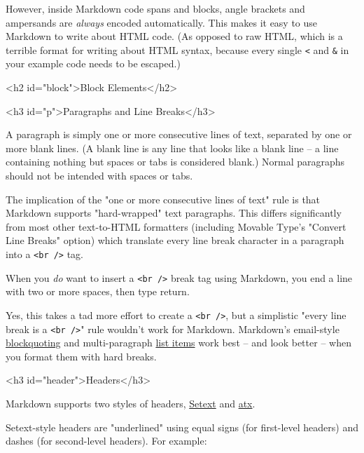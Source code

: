 However, inside Markdown code spans and blocks, angle brackets and
ampersands are \emph{always} encoded automatically. This makes it easy to use
Markdown to write about HTML code. (As opposed to raw HTML, which is a
terrible format for writing about HTML syntax, because every single \texttt{<}
and \texttt{\&} in your example code needs to be escaped.)

\noindent\makebox[\linewidth]{\rule{\linewidth}{0.4pt}}\medskip


<h2 id="block">Block Elements</h2>

<h3 id="p">Paragraphs and Line Breaks</h3>



A paragraph is simply one or more consecutive lines of text, separated
by one or more blank lines. (A blank line is any line that looks like a
blank line -- a line containing nothing but spaces or tabs is considered
blank.) Normal paragraphs should not be intended with spaces or tabs.



The implication of the "one or more consecutive lines of text" rule is
that Markdown supports "hard-wrapped" text paragraphs. This differs
significantly from most other text-to-HTML formatters (including Movable
Type's "Convert Line Breaks" option) which translate every line break
character in a paragraph into a \texttt{<br />} tag.



When you \emph{do} want to insert a \texttt{<br />} break tag using Markdown, you
end a line with two or more spaces, then type return.



Yes, this takes a tad more effort to create a \texttt{<br />}, but a simplistic
"every line break is a \texttt{<br />}" rule wouldn't work for Markdown.
Markdown's email-style \href{\#blockquote}{blockquoting} and multi-paragraph \href{\#list}{list items}
work best -- and look better -- when you format them with hard breaks.

<h3 id="header">Headers</h3>



Markdown supports two styles of headers, \href{http://docutils.sourceforge.net/mirror/setext.html}{Setext} and \href{http://www.aaronsw.com/2002/atx/}{atx}.



Setext-style headers are "underlined" using equal signs (for first-level
headers) and dashes (for second-level headers). For example:

